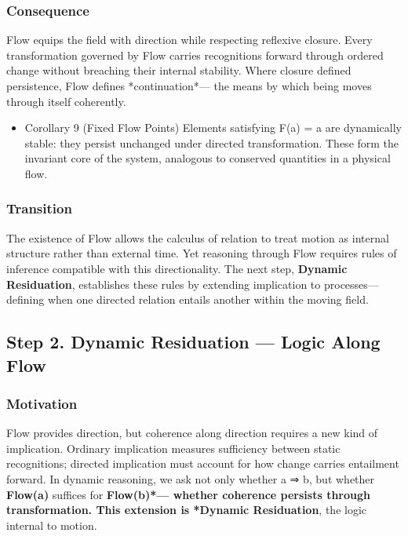 \documentclass[11pt]{article}
\begin{document}
\subsubsection*{Consequence}
\label{sec:org1879db7}
Flow equips the field with direction while respecting reflexive closure.  
Every transformation governed by Flow carries recognitions forward through ordered change without breaching their internal stability.  
Where closure defined persistence, Flow defines *continuation*—  
the means by which being moves through itself coherently.
\begin{itemize}
\item Corollary 9 (Fixed Flow Points)
\label{sec:org8f772eb}
Elements satisfying F(a) = a are dynamically stable:  
they persist unchanged under directed transformation.  
These form the invariant core of the system,  
analogous to conserved quantities in a physical flow.
\end{itemize}
\subsubsection*{Transition}
\label{sec:org76aec9e}
The existence of Flow allows the calculus of relation to treat motion as internal structure rather than external time.  
Yet reasoning through Flow requires rules of inference compatible with this directionality.  
The next step, \textbf{Dynamic Residuation}, establishes these rules by extending implication to processes—  
defining when one directed relation entails another within the moving field.
\subsection*{Step 2. Dynamic Residuation — Logic Along Flow}
\label{sec:org0cb6025}

\subsubsection*{Motivation}
\label{sec:org29a7ea7}
Flow provides direction, but coherence along direction requires a new kind of implication.  
Ordinary implication measures sufficiency between static recognitions;  
directed implication must account for how change carries entailment forward.  
In dynamic reasoning, we ask not only whether a ⇒ b,  
but whether \textbf{Flow(a)} suffices for \textbf{Flow(b)*—  
whether coherence persists through transformation.  
This extension is *Dynamic Residuation}, the logic internal to motion.
\end{document}
